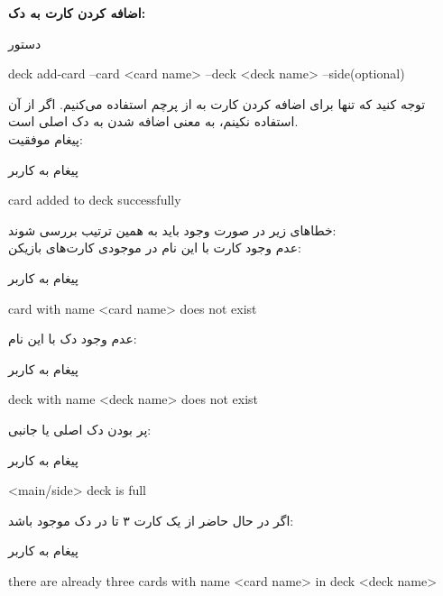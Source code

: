 \documentclass[]{article}
\begin{document}
\vspace{.5cm}
\textbf{اضافه کردن کارت به دک:}
\begin{mybox}[colback=yellow]{دستور}
	\begin{latin}	
		deck add-card --card <card name> --deck <deck name> --side(optional)
	\end{latin}
\end{mybox}
توجه کنید که تنها برای اضافه کردن کارت به  از پرچم  
استفاده می‌کنیم. اگر از آن استفاده نکینم، به معنی اضافه شدن به دک اصلی است.
\\
پیغام موفقیت:
\begin{mybox}[colback=yellow]{پیغام به کاربر}
	\begin{latin}	
		card added to deck successfully
	\end{latin}
\end{mybox}
خطاهای زیر در صورت وجود باید به همین ترتیب بررسی شوند:
\\
عدم وجود کارت با این نام در موجودی کارت‌های بازیکن:
\begin{mybox}[colback=yellow]{پیغام به کاربر}
	\begin{latin}	
		card with name <card name> does not exist
	\end{latin}
\end{mybox}
عدم وجود دک با این نام:
\begin{mybox}[colback=yellow]{پیغام به کاربر}
	\begin{latin}	
		deck with name <deck name> does not exist
	\end{latin}
\end{mybox}
پر بودن دک اصلی یا جانبی:
\begin{mybox}[colback=yellow]{پیغام به کاربر}
	\begin{latin}	
		<main/side> deck is full
	\end{latin}
\end{mybox}
اگر در حال حاضر از یک کارت ۳ تا در دک موجود باشد:
\begin{mybox}[colback=yellow]{پیغام به کاربر}
	\begin{latin}	
		there are already three cards with name <card name> in deck <deck name>
	\end{latin}
\end{mybox}
\end{document}

